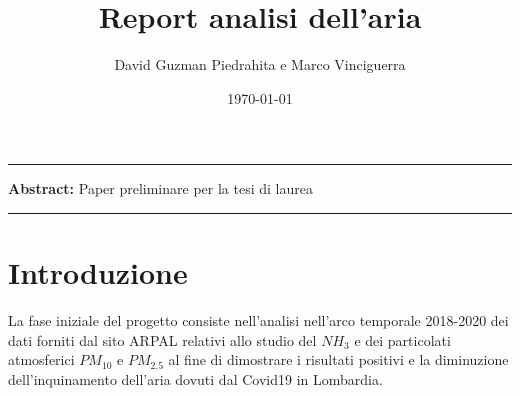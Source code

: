 \documentclass{article}
\title{Report analisi dell'aria}
\author{David Guzman Piedrahita e Marco Vinciguerra}
\date{\today}
\begin{document}
\maketitle

\par\noindent\rule{\textwidth}{0.4pt}
\textbf{Abstract:} Paper preliminare per la tesi di laurea
\par\noindent\rule{\textwidth}{0.4pt}

\section{Introduzione}
La fase iniziale del progetto consiste nell'analisi nell'arco temporale 2018-2020 dei dati 
forniti dal sito ARPAL relativi allo studio del $NH_{3}$ e dei particolati atmosferici $PM_{10}$ e $PM_{2.5}$ al 
fine di dimostrare i risultati positivi e la diminuzione dell'inquinamento dell'aria 
dovuti dal Covid19 in Lombardia.
\end{document}
